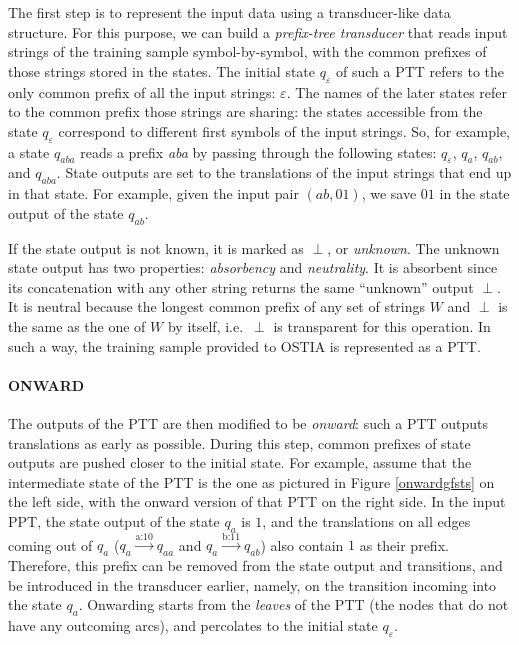 The first step is to represent the input data using a transducer-like data structure.
For this purpose, we can build a \emph{prefix-tree transducer} that reads input strings of the training sample symbol-by-symbol, with the common prefixes of those strings stored in the states.
The initial state $q_\varepsilon$ of such a PTT refers to the only common prefix of all the input strings: $\varepsilon$.
The names of the later states refer to the common prefix those strings are sharing: the states accessible from the state $q_\varepsilon$ correspond to different first symbols of the input strings.
So, for example, a state $q_{aba}$ reads a prefix \emph{aba} by passing through the following states: $q_\varepsilon$, $q_{a}$, $q_{ab}$, and $q_{aba}$.
State outputs are set to the translations of the input strings that end up in that state.
For example, given the input pair $(ab, 01)$, we save $01$ in the state output of the state $q_{ab}$.

If the state output is not known, it is marked as $\perp$, or \emph{unknown}.
The unknown state output has two properties: \emph{absorbency} and \emph{neutrality}.
It is absorbent since its concatenation with any other string returns the same ``unknown'' output $\perp$.
It is neutral because the longest common prefix of any set of strings $W$ and $\perp$ is the same as the one of $W$ by itself, i.e.\  $\perp$ is transparent for this operation.
In such a way, the training sample provided to OSTIA is represented as a PTT.


\paragraph{ONWARD}

The outputs of the PTT are then modified to be \emph{onward}: such a PTT outputs translations as early as possible.
During this step, common prefixes of state outputs are pushed closer to the initial state.
For example, assume that the intermediate state of the PTT is the one as pictured in Figure \ref{onwardgfsts} on the left side, with the onward version of that PTT on the right side.
In the input PPT, the state output of the state $q_a$ is $1$, and the translations on all edges coming out of $q_a$ ($q_a\xrightarrow{\text{a:10}}q_{aa}$ and $q_a\xrightarrow{\text{b:11}}q_{ab}$) also contain $1$ as their prefix.
Therefore, this prefix can be removed from the state output and transitions, and be introduced in the transducer earlier, namely, on the transition incoming into the state $q_a$.
Onwarding starts from the \emph{leaves} of the PTT (the nodes that do not have any outcoming arcs), and percolates to the initial state $q_\varepsilon$.




